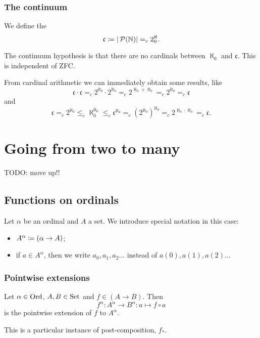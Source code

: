 \subsection{The continuum}
\begin{definition}
We define the 
\[ \mathfrak{c} \coloneqq |\operatorname{\mathcal{P}}(\mathbb{N})| =_c 2^\aleph_0. \]
\end{definition}
The continuum hypothesis is that there are no cardinals between $\aleph_0$ and $\mathfrak{c}$. This is independent of ZFC.

From cardinal arithmetic we can immediately obtain some results, like
\[ \mathfrak{c}\cdot\mathfrak{c} =_c 2^{\aleph_0}\cdot 2^{\aleph_0} =_c 2^{\aleph_0+\aleph_0} =_c 2^{\aleph_0} =_c \mathfrak{c}\]
and
\[ \mathfrak{c} =_c 2^{\aleph_0} \leq_c \aleph_0^{\aleph_0} \leq_c \mathfrak{c}^{\aleph_0} =_c \left(2^{\aleph_0}\right)^{\aleph_0} =_c 2^{\aleph_0\cdot \aleph_0} =_c \mathfrak{c}.\]




\chapter{Going from two to many}
TODO: move up!!
\section{Functions on ordinals}
\begin{definition}
Let $\alpha$ be an ordinal and $A$ a set. We introduce special notation in this case:
\begin{itemize}
\item $A^\alpha \coloneqq (\alpha \to A)$;
\item if $a\in A^\alpha$, then we write $a_0, a_1, a_2 \ldots$ instead of $a(0), a(1), a(2) \ldots$
\end{itemize}
\end{definition}

\subsection{Pointwise extensions}
\begin{definition}
Let $\alpha\in\operatorname{Ord}$, $A,B\in\operatorname{Set}$ and $f\in (A\to B)$. Then
\[ f^\alpha: A^\alpha \to B^\alpha: a\mapsto f\circ a \]
is the pointwise extension of $f$ to $A^\alpha$.
\end{definition}
This is a particular instance of post-composition, $f_*$.

